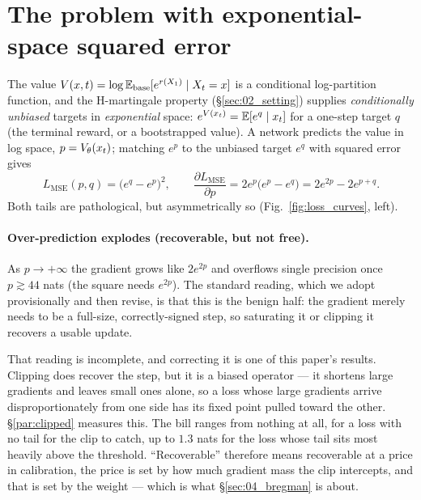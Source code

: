 \section{The problem with exponential-space squared error}
\label{sec:03_expmse}

The value $V(x,t)=\log\mathbb{E}_{\mathrm{base}}[e^{r(X_1)}\mid X_t=x]$ is a conditional
log-partition function, and the H-martingale property (\S\ref{sec:02_setting})
supplies \emph{conditionally unbiased} targets in \emph{exponential} space:
$e^{V(x_t)}=\mathbb{E}[e^{q}\mid x_t]$ for a one-step target $q$ (the terminal
reward, or a bootstrapped value). A network predicts the value in log space,
$p=V_\theta(x_t)$; matching $e^{p}$ to the unbiased target $e^{q}$ with
squared error gives
\begin{equation}
  L_{\mathrm{MSE}}(p,q)=\big(e^{q}-e^{p}\big)^2,
  \qquad
  \frac{\partial L_{\mathrm{MSE}}}{\partial p}=2e^{p}\big(e^{p}-e^{q}\big)
    =2e^{2p}-2e^{p+q}.
  \label{eq:mse-grad}
\end{equation}
Both tails are pathological, but asymmetrically so
(Fig.~\ref{fig:loss_curves}, left).

\paragraph{Over-prediction explodes (recoverable, but not free).}
As $p\to+\infty$ the gradient grows like $2e^{2p}$ and overflows single
precision once $p\gtrsim 44$ nats (the square needs $e^{2p}$). The standard
reading, which we adopt provisionally and then revise, is that this is the
benign half: the gradient merely needs to be a full-size, correctly-signed
step, so saturating it or clipping it recovers a usable update.

That reading is incomplete, and correcting it is one of this paper's results.
Clipping does recover the step, but it is a biased operator --- it shortens
large gradients and leaves small ones alone, so a loss whose large gradients
arrive disproportionately from one side has its fixed point pulled toward the
other. \S\ref{par:clipped} measures this. The bill ranges from nothing at all, for a
loss with no tail for the clip to catch, up to $1.3$ nats for the loss whose
tail sits most heavily above the threshold. ``Recoverable'' therefore means
recoverable at a price in calibration, the price is set by how much gradient
mass the clip intercepts, and that is set by the weight --- which is what
\S\ref{sec:04_bregman} is about.

